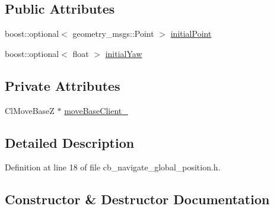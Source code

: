 \subsection*{Public Attributes}
\begin{DoxyCompactItemize}
\item 
boost\+::optional$<$ geometry\+\_\+msgs\+::\+Point $>$ \hyperlink{classsm__dance__bot_1_1move__base__z__client_1_1CbNavigateGlobalPosition_a7e8224311686be554d68853ff757be5d}{initial\+Point}
\item 
boost\+::optional$<$ float $>$ \hyperlink{classsm__dance__bot_1_1move__base__z__client_1_1CbNavigateGlobalPosition_a2466eeabb6e2a3f35427a444a369d45e}{initial\+Yaw}
\end{DoxyCompactItemize}
\subsection*{Private Attributes}
\begin{DoxyCompactItemize}
\item 
Cl\+Move\+BaseZ $\ast$ \hyperlink{classsm__dance__bot_1_1move__base__z__client_1_1CbNavigateGlobalPosition_a301398c07738d6680e163782d35365c5}{move\+Base\+Client\+\_\+}
\end{DoxyCompactItemize}


\subsection{Detailed Description}


Definition at line 18 of file cb\+\_\+navigate\+\_\+global\+\_\+position.\+h.



\subsection{Constructor \& Destructor Documentation}
